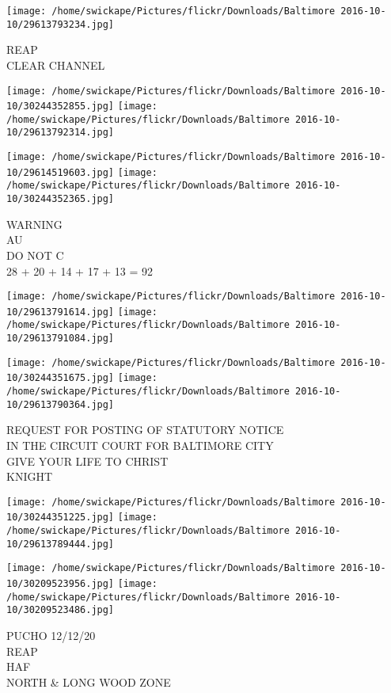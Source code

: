 \documentclass[10pt,letterpaper]{article}
\begin{document}
\vspace{0.25in}
\texttt{[image: /home/swickape/Pictures/flickr/Downloads/Baltimore 2016-10-10/29613793234.jpg]}

REAP\\
CLEAR CHANNEL\\
\pagebreak

\texttt{[image: /home/swickape/Pictures/flickr/Downloads/Baltimore 2016-10-10/30244352855.jpg]}
\texttt{[image: /home/swickape/Pictures/flickr/Downloads/Baltimore 2016-10-10/29613792314.jpg]}

\texttt{[image: /home/swickape/Pictures/flickr/Downloads/Baltimore 2016-10-10/29614519603.jpg]}
\texttt{[image: /home/swickape/Pictures/flickr/Downloads/Baltimore 2016-10-10/30244352365.jpg]}

WARNING\\
AU\\
DO NOT C\\
28 + 20 + 14 + 17 + 13 = 92\\
\pagebreak

\texttt{[image: /home/swickape/Pictures/flickr/Downloads/Baltimore 2016-10-10/29613791614.jpg]}
\texttt{[image: /home/swickape/Pictures/flickr/Downloads/Baltimore 2016-10-10/29613791084.jpg]}

\texttt{[image: /home/swickape/Pictures/flickr/Downloads/Baltimore 2016-10-10/30244351675.jpg]}
\texttt{[image: /home/swickape/Pictures/flickr/Downloads/Baltimore 2016-10-10/29613790364.jpg]}

REQUEST FOR POSTING OF STATUTORY NOTICE\\
IN THE CIRCUIT COURT FOR BALTIMORE CITY\\
GIVE YOUR LIFE TO CHRIST\\
KNIGHT\\
\pagebreak

\texttt{[image: /home/swickape/Pictures/flickr/Downloads/Baltimore 2016-10-10/30244351225.jpg]}
\texttt{[image: /home/swickape/Pictures/flickr/Downloads/Baltimore 2016-10-10/29613789444.jpg]}

\texttt{[image: /home/swickape/Pictures/flickr/Downloads/Baltimore 2016-10-10/30209523956.jpg]}
\texttt{[image: /home/swickape/Pictures/flickr/Downloads/Baltimore 2016-10-10/30209523486.jpg]}

PUCHO 12/12/20\\
REAP\\
HAF\\
NORTH \& LONG WOOD ZONE\\
\pagebreak
\end{document}
